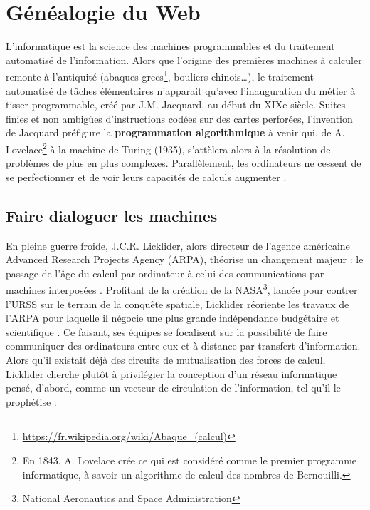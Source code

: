 \documentclass[symmetric,justified,marginals=raggedouter]{tufte-book}
\begin{document}
\section{Généalogie du Web}
\label{sec:2_web}

\noindent L'informatique est la science des machines programmables et du traitement automatisé de l'information. Alors que l'origine des premières machines à calculer remonte à l'antiquité (abaques grecs\footnote{\RaggedOuter \url{https://fr.wikipedia.org/wiki/Abaque\_(calcul)}}, bouliers chinois\ldots{}), le traitement automatisé de tâches élémentaires n'apparait qu'avec l'inauguration du métier à tisser programmable, créé par J.M. Jacquard, au début du XIXe siècle. Suites finies et non ambigües d'instructions codées sur des cartes perforées, l'invention de Jacquard préfigure la \textbf{programmation algorithmique} à venir qui, de A. Lovelace\footnote{\RaggedOuter En 1843, A. Lovelace crée ce qui est considéré comme le premier programme informatique, à savoir un algorithme de calcul des nombres de Bernouilli.} à la machine de Turing (1935), s'attèlera alors à la résolution de problèmes de plus en plus complexes. Parallèlement, les ordinateurs ne cessent de se perfectionner et de voir leurs capacités de calculs augmenter \citep{lazard_histoire_2016}.

\subsection{Faire dialoguer les machines}

\noindent En pleine guerre froide, J.C.R. Licklider, alors directeur de l'agence américaine Advanced Research Projects Agency (ARPA), théorise un changement majeur : le passage de l'âge du calcul par ordinateur à celui des communications par machines interposées \citep{licklider_computer_1968}. Profitant de la création de la NASA\footnote{\RaggedOuter National Aeronautics and Space Administration}, lancée pour contrer l'URSS sur le terrain de la conquête spatiale, Licklider réoriente les travaux de l'ARPA pour laquelle il négocie une plus grande indépendance budgétaire et scientifique \citep{treguer_pouvoir_2017}. Ce faisant, ses équipes se focalisent sur la possibilité de faire communiquer des ordinateurs entre eux et à distance par transfert d'information. Alors qu'il existait déjà des circuits de mutualisation des forces de calcul, Licklider cherche plutôt à privilégier la conception d'un réseau informatique pensé, d'abord, comme un vecteur de circulation de l'information, tel qu'il le prophétise : \\
\end{document}
